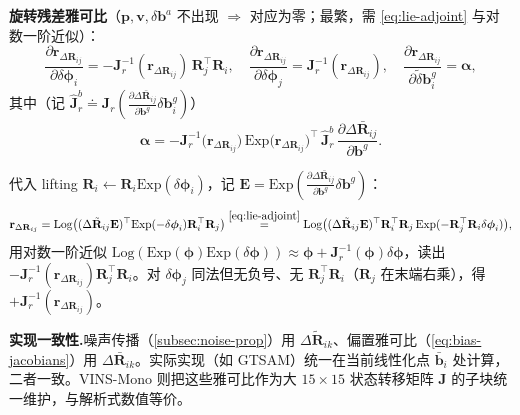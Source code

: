 \textbf{旋转残差雅可比}（$\mathbf p,\mathbf v,\delta\mathbf b^a$ 不出现 $\Rightarrow$ 对应为零；最繁，需 \cref{eq:lie-adjoint} 与对数一阶近似）：
\begin{equation}
  \frac{\partial\mathbf r_{\Delta\mathbf R_{ij}}}{\partial\delta\boldsymbol\phi_i}=-\mathbf J_r^{-1}(\mathbf r_{\Delta\mathbf R_{ij}})\,\mathbf R_j^\top\mathbf R_i,\quad
  \frac{\partial\mathbf r_{\Delta\mathbf R_{ij}}}{\partial\delta\boldsymbol\phi_j}=\mathbf J_r^{-1}(\mathbf r_{\Delta\mathbf R_{ij}}),\quad
  \frac{\partial\mathbf r_{\Delta\mathbf R_{ij}}}{\partial\tilde\delta\mathbf b_i^g}=\boldsymbol\alpha,
  \label{eq:jac-R}
\end{equation}
其中（记 $\hat{\mathbf J}_r^b\doteq\mathbf J_r(\tfrac{\partial\Delta\bar{\mathbf R}_{ij}}{\partial\mathbf b^g}\delta\mathbf b_i^g)$）
\[
  \boldsymbol\alpha=-\mathbf J_r^{-1}\big(\mathbf r_{\Delta\mathbf R_{ij}}\big)\,\mathrm{Exp}\big(\mathbf r_{\Delta\mathbf R_{ij}}\big)^\top\,\hat{\mathbf J}_r^b\,\frac{\partial\Delta\bar{\mathbf R}_{ij}}{\partial\mathbf b^g}.
\]

\begin{derivation}
代入 lifting $\mathbf R_i\leftarrow\mathbf R_i\mathrm{Exp}(\delta\boldsymbol\phi_i)$，记 $\mathbf E=\mathrm{Exp}(\tfrac{\partial\Delta\bar{\mathbf R}_{ij}}{\partial\mathbf b^g}\delta\mathbf b^g)$：
\[
  \mathbf r_{\Delta\mathbf R_{ij}}=\mathrm{Log}\big((\Delta\tilde{\mathbf R}_{ij}\mathbf E)^\top\mathrm{Exp}(-\delta\boldsymbol\phi_i)\mathbf R_i^\top\mathbf R_j\big)
  \overset{\eqref{eq:lie-adjoint}}{=}\mathrm{Log}\big((\Delta\tilde{\mathbf R}_{ij}\mathbf E)^\top\mathbf R_i^\top\mathbf R_j\,\mathrm{Exp}(-\mathbf R_j^\top\mathbf R_i\delta\boldsymbol\phi_i)\big),
\]
用对数一阶近似 $\mathrm{Log}(\mathrm{Exp}(\boldsymbol\phi)\mathrm{Exp}(\delta\boldsymbol\phi))\approx\boldsymbol\phi+\mathbf J_r^{-1}(\boldsymbol\phi)\delta\boldsymbol\phi$，读出 $-\mathbf J_r^{-1}(\mathbf r_{\Delta\mathbf R_{ij}})\mathbf R_j^\top\mathbf R_i$。对 $\delta\boldsymbol\phi_j$ 同法但无负号、无 $\mathbf R_j^\top\mathbf R_i$（$\mathbf R_j$ 在末端右乘），得 $+\mathbf J_r^{-1}(\mathbf r_{\Delta\mathbf R_{ij}})$。
\end{derivation}

\begin{note}
\textbf{实现一致性.}\;噪声传播（\cref{subsec:noise-prop}）用 $\Delta\tilde{\mathbf R}_{ik}$、偏置雅可比（\cref{eq:bias-jacobians}）用 $\Delta\bar{\mathbf R}_{ik}$。实际实现（如 GTSAM）统一在当前线性化点 $\bar{\mathbf b}_i$ 处计算，二者一致。VINS-Mono 则把这些雅可比作为大 $15\times15$ 状态转移矩阵 $\mathbf J$ 的子块统一维护，与解析式数值等价\cite{qin2018vins}。
\end{note}

